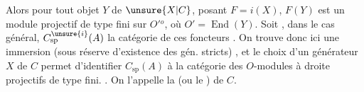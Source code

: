 
Alors pour tout objet $Y$ de $\unsure{X|C}$,  posant $F=i(X)$,
$F(Y)$ est un module  projectif de type fini sur $O'{}^o$, où $O'=\operatorname{End}(Y)$.
Soit , dans le cas général,
$C_{\mathrm{sp}}^{\unsure{i}}(A)$ la catégorie de ces foncteurs .
On trouve donc ici une immersion (sous réserve d'existence des gén. stricts)
,
et le choix d'un générateur  $X$ de $C$ permet d'identifier
$C_{\mathrm{sp}}(A)$ à la catégorie des $O$-modules à droite projectifs de type fini.
. On l'appelle la
(ou le  ) de $C$.
